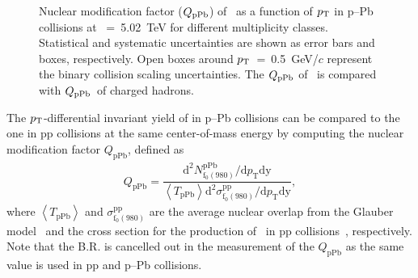 \begin{figure}[!hbt]
	\centering
	\caption{ Nuclear modification factor ($Q_{\rm{pPb}}$) of \fzero~as a function of $p_{\rm{T}}$ in p--Pb collisions at \snn~=~5.02~TeV for different multiplicity classes. Statistical and systematic uncertainties are shown as error bars and boxes, respectively. Open boxes around $p_{\rm{T}}$~=~0.5~GeV/$c$ represent the binary collision scaling uncertainties. The $Q_{\rm{pPb}}$ of \fzero~is compared with $Q_{\rm{pPb}}$~of charged hadrons. }
	\label{fig:QpPb}
\end{figure}

The $p_{\rm{T}}$-differential invariant yield of \fzero in p--Pb collisions can be compared to the one in pp collisions at the same center-of-mass energy by computing the nuclear modification factor $Q_{\mbox{pPb}}$, defined as 
\begin{eqnarray}
Q_{\mbox{pPb}} = \dfrac{\mathrm{d}^{2} N_{\mathrm{f}_{0}(980)}^{\mathrm{pPb}} / \mathrm{d} p_{\mathrm{T}} \mathrm{dy} }{ \left\langle T_{\mathrm{pPb}} \right\rangle \mathrm{d}^{2} \sigma_{\mathrm{f}_{0}(980)}^{\mathrm{pp}}/ \mathrm{d} p_{\mathrm{T}} \mathrm{dy} },
\end{eqnarray}
where $\left\langle T_{\mathrm{pPb}} \right\rangle$ and $\sigma_{\mathrm{f}_{0}(980)}^{\mathrm{pp}}$ are the average nuclear overlap from the Glauber model~\cite{Miller:2007ri} and the cross section for the production of \fzero~in pp collisions~\cite{ALICE:2022qnb}, respectively. Note that the B.R. is cancelled out in the measurement of the $Q_{\mbox{pPb}}$ as the same value is used in pp and p--Pb collisions.


